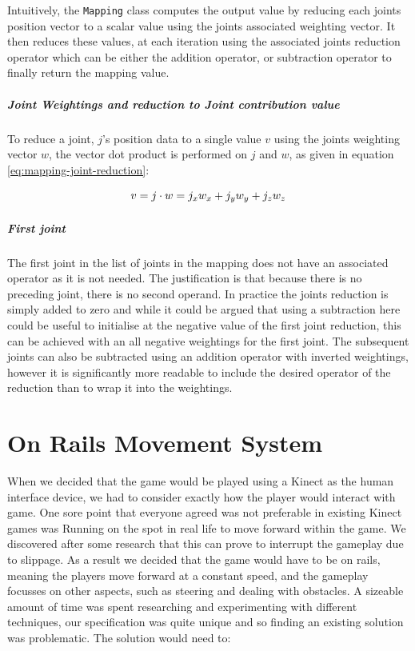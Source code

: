 \documentclass[a4paper,oneside]{memoir}
\begin{document}
					Intuitively, the \texttt{Mapping} class computes the output value by reducing each joints position vector to a scalar value using the joints associated weighting vector.
					It then reduces these values, at each iteration using the associated joints reduction operator which can be either the addition operator, or subtraction operator to finally return the mapping value. 

					\subparagraph{Joint Weightings and reduction to Joint contribution value}

						To reduce a joint, $j$'s position data to a single value $v$ using the joints weighting vector $w$, the vector dot product is performed on $j$ and $w$, as given in equation \ref{eq:mapping-joint-reduction}:

						\begin{equation}
							v = j \cdot w = j_x\*w_x+j_y\*w_y+j_z\*w_z
							\label{eq:mapping-joint-reduction}
						\end{equation}

					\subparagraph{First joint}

						The first joint in the list of joints in the mapping does not have an associated operator as it is not needed. 
						The justification is that because there is no preceding joint, there is no second operand.
						In practice the joints reduction is simply added to zero and while it could be argued that using a subtraction here could be useful to initialise at the negative value of the first joint reduction, this can be achieved with an all negative weightings for the first joint.
						The subsequent joints can also be subtracted using an addition operator with inverted weightings, however it is significantly more readable to include the desired operator of the reduction than to wrap it into the weightings.


		\section{On Rails Movement System}

			When we decided that the game would be played using a Kinect as the human interface device, we had to consider exactly how the player would interact with game.
			One sore point that everyone agreed was not preferable in existing Kinect games was Running on the spot in real life to move forward within the game. We discovered after some research that this can prove to interrupt the gameplay due to slippage.
			As a result we decided that the game would have to be on rails, meaning the players move forward at a constant speed, and the gameplay focusses on other aspects, such as steering and dealing with obstacles.
			A sizeable amount of time was spent researching and experimenting with different techniques, our specification was quite unique and so finding an existing solution was problematic.
			The solution would need to:
\end{document}
